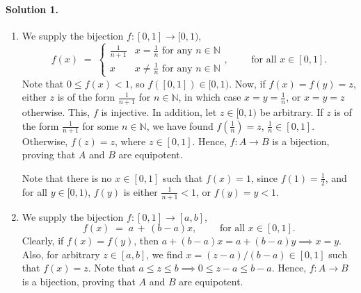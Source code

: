 \documentclass[10pt]{article}
\begin{document}
        \paragraph{Solution 1.}
        \begin{enumerate}
                \item We supply the bijection $f\colon [0, 1] \to [0, 1)$,
                \[
                f(x) \;=\; \begin{cases}
                        \frac{1}{n + 1} & x = \frac{1}{n} \text{ for any } n \in \mathbb{N}\\
                        x               & x \neq \frac{1}{n} \text { for any } n \in \mathbb{N}
                \end{cases}, \quad\quad \text{ for all }x \in [0, 1].
                \]
                Note that $0 \leq f(x) < 1$, so $f([0, 1]) \in [0, 1)$. Now, if $f(x) = f(y) = z$, either $z$ is of the form $\frac{1}{n + 1}$ for
                $n \in \mathbb{N}$, in which case $x = y = \frac{1}{n}$, or $x = y = z$ otherwise. This, $f$ is injective.
                In addition, let $z \in [0, 1)$ be arbitrary. If $z$ is of the form $\frac{1}{n + 1}$ for some $n \in \mathbb{N}$, we have found
                $f(\frac{1}{n}) = z$, $\frac{1}{n} \in [0, 1]$. Otherwise, $f(z) = z$, where $z \in [0, 1]$.
                Hence, $f\colon A\to B$ is a bijection, proving that $A$ and $B$ are equipotent.

                Note that there is no $x \in [0, 1]$ such that $f(x) = 1$, since $f(1) = \frac{1}{2}$, and for all $y \in [0, 1)$,
                $f(y)$ is either $\frac{1}{n + 1} < 1$, or $f(y) = y < 1$.

                \item We supply the bijection $f\colon [0, 1]\to [a, b]$,
                \[
                f(x) \;=\; a \,+\, (b - a)x, \quad\quad\text{ for all }x \in [0, 1].
                \]
                Clearly, if $f(x) = f(y)$, then $a + (b-a)x = a + (b-a)y \implies x = y$. Also, for arbitrary $z \in [a, b]$, we find
                $x = (z - a)/(b - a) \in [0, 1]$ such that $f(x) = z$. Note that $a \leq z \leq b \implies 0 \leq z - a \leq b - a$.
                Hence, $f\colon A\to B$ is a bijection, proving that $A$ and $B$ are equipotent.
                

\end{enumerate}
\end{document}
